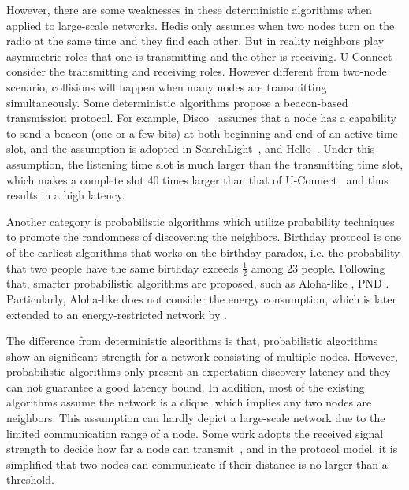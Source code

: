 However, there are some weaknesses in these deterministic algorithms when applied to large-scale networks.
Hedis \cite{chen2015heterogeneous} only assumes when two nodes turn on the radio at the same time and they find each other. 
But in reality neighbors play asymmetric roles that one is transmitting and the other is receiving.
U-Connect~\cite{kandhalu2010u} consider the transmitting and receiving roles.
However different from two-node scenario, collisions will happen when many nodes are transmitting simultaneously. 
Some deterministic algorithms propose a beacon-based transmission protocol.
For example, Disco~\cite{dutta2008practical} assumes that a node has a capability to send a beacon (one or a few bits) at both beginning and end of an active time slot, and the assumption is adopted in 
SearchLight~\cite{bakht2012searchlight}, and Hello~\cite{sun2014hello}.
Under this assumption, the listening time slot is much larger than the transmitting time slot, which makes a complete slot 
40 times larger than that of U-Connect~\cite{kandhalu2010u} and thus results in a high latency.


Another category is probabilistic algorithms \cite{mcglynn2001birthday,
vasudevan2009neighbor,you2011aloha,song2014probabilistic} which utilize probability techniques to promote the randomness
of discovering the neighbors. 
Birthday protocol \cite{mcglynn2001birthday} is one of the earliest algorithms that works on the birthday
paradox, i.e. the probability that two people have the same
birthday exceeds $\frac{1}{2}$ among $23$ people. Following that,
smarter probabilistic algorithms are proposed, such as Aloha-like \cite{vasudevan2009neighbor, you2011aloha}, PND \cite{song2014probabilistic}. Particularly, Aloha-like \cite{vasudevan2009neighbor} does not consider the energy consumption, which is later extended to an energy-restricted network by \cite{you2011aloha}.

The difference from deterministic algorithms is that,
probabilistic algorithms show an significant strength for a network consisting of multiple nodes.
However, probabilistic algorithms only present an expectation discovery latency and they
can not guarantee a good latency bound.
In addition, most of the existing algorithms assume the network is a clique, which implies any two nodes are neighbors. 
This assumption can hardly depict a large-scale network due to the limited communication range of a node.
Some work adopts the received signal strength to decide how far a node can transmit~\cite{daiya2011experimental}, and in the protocol model, it is simplified that two nodes can communicate if their distance is no larger than a threshold.


